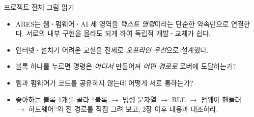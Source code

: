 \begin{teachbox}{프로젝트 전체 그림 읽기}
\begin{itemize}
  \item ARES는 웹\textbf{·}펌웨어\textbf{·}AI 세 영역을 \emph{텍스트 명령}이라는 단순한 약속만으로 연결한다. 서로의 내부 구현을 몰라도 되게 하여 독립적 개발\textbf{·}교체가 쉽다.
  \item 인터넷\textbf{·}설치가 어려운 교실을 전제로 \emph{오프라인 우선}으로 설계했다.
\end{itemize}
\begin{itemize}
  \item 블록 하나를 누르면 명령은 \emph{어디서} 만들어져 \emph{어떤 경로로} 로버에 도달하는가?
  \item 웹과 펌웨어가 코드를 공유하지 않는데 어떻게 서로 통하는가?
\end{itemize}
\begin{itemize}
  \item 좋아하는 블록 1개를 골라 ``블록 $\to$ 명령 문자열 $\to$ BLE $\to$ 펌웨어 핸들러 $\to$ 하드웨어''의 전 경로를 직접 그려 보고, 2장 이후 내용과 대조하라.
\end{itemize}
\end{teachbox}


